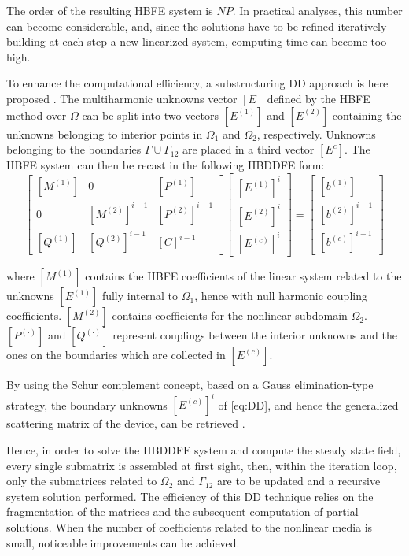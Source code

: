 \documentclass[journal]{IEEEtran}
\begin{document}
The order of the resulting HBFE system is $N P$. In practical analyses, this
number can become considerable, and, since the
solutions have to be refined iteratively building at each step a new linearized
system, computing time can become too high. 

To enhance the computational efficiency, a substructuring DD
approach is here proposed \cite{Saad2000, Toselli2005, Guarnieri2009,
Guarnieri2010}. The multiharmonic unknowns vector $[E]$ defined by the HBFE method
over $\Omega$ can be split into two vectors $[E^{(1)}]$ and $[E^{(2)}]$
containing the unknowns belonging to interior points in $\Omega_1$ and
$\Omega_2$, respectively. Unknowns belonging to the boundaries
$\Gamma\cup\Gamma_{12}$ are placed in a third vector $[E^c]$. The HBFE system
can then be recast in the following HBDDFE form:
%
\begin{equation}\label{eq:DD}
\begin{bmatrix}
 [M^{(1)}] &  0  &  [P^{(1)}] \\
 0  &  [M^{(2)}]^{i-1} & [P^{(2)}]^{i-1} \\
 [Q^{(1)}] & [Q^{(2)}]^{i-1} & [C]^{i-1}
\end{bmatrix}
\!\!
\begin{bmatrix}
{[E^{(1)}]^{i}} \\
{[E^{(2)}]^{i}} \\
{[E^{(c)}]^{i}}
\end{bmatrix} 
\!\!=\!\!
\begin{bmatrix}
{[b^{(1)}]} \\
{[b^{(2)}]}^{i-1} \\
{[b^{(c)}]}^{i-1}
\end{bmatrix} 
\end{equation}

\noindent where $[M^{(1)}]$ contains the HBFE coefficients of the linear system
related to the unknowns $[E^{(1)}]$ fully internal to $\Omega_1$, hence with
null harmonic coupling coefficients. $[M^{(2)}]$ contains coefficients for the
nonlinear subdomain $\Omega_2$. ${[P^{(\cdot)}]}$ and ${[Q^{(\cdot)}]}$
represent couplings between the interior unknowns and the ones on the
boundaries which are collected in $[E^{(c)}]$. 

By using the Schur complement concept, based on a Gauss elimination-type
strategy, the boundary unknowns $[E^{(c)}]^{i}$ of \eqref{eq:DD}, and hence the
generalized scattering matrix of the device, can be retrieved 
\cite{Guarnieri2009, Guarnieri2010}.

Hence, in order to solve the HBDDFE system and compute the steady state field,
every single submatrix is assembled at first sight, then, within the iteration
loop, only the submatrices related to $\Omega_2$ and $\Gamma_{12}$ are to be
updated and a recursive system solution performed. The efficiency of this 
DD technique relies on the fragmentation of the
matrices and the subsequent computation of partial solutions. When the number
of coefficients related to the nonlinear media is small, noticeable
improvements can be achieved.
\end{document}
